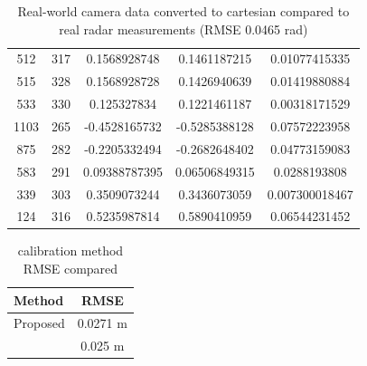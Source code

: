 \begin{table}[htbp]
\begin{tabular}{|c|c|c|c|c|}
        512 & 317 & 0.1568928748 & 0.1461187215 & 0.01077415335 \\
        515 & 328 & 0.1568928728 & 0.1426940639 & 0.01419880884 \\
        533 & 330 & 0.125327834 & 0.1221461187 & 0.00318171529 \\
        1103 & 265 & -0.4528165732 & -0.5285388128 & 0.07572223958 \\
        875 & 282 & -0.2205332494 & -0.2682648402 & 0.04773159083 \\
        583 & 291 & 0.09388787395 & 0.06506849315 & 0.0288193808 \\
        339 & 303 & 0.3509073244 & 0.3436073059 & 0.007300018467 \\
        124 & 316 & 0.5235987814 & 0.5890410959 & 0.06544231452 \\
    \hline
\end{tabular}
\caption{Real-world camera data converted to cartesian compared to real radar measurements (RMSE 0.0465 rad)}
\label{tab:cam_radar_data}
\end{table}

\begin{table}[h!]
    \begin{center}
      \label{tab:table4}
      \begin{tabular}{l|c} %
        \textbf{Method} & \textbf{RMSE} \\%
        \hline
        Proposed                            & 0.0271 m \\%
        \citeauthor{8794186}\cite{8794186}  & 0.025 m \\%
        
      \end{tabular}
    \end{center}
    \caption{calibration method RMSE compared}
    \label{tab:callib_rmse}
  \end{table}


\newpage
